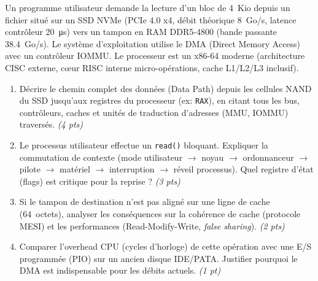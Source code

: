 \documentclass[11pt]{article}
\begin{document}
\begin{exercice}
Un programme utilisateur demande la lecture d'un bloc de \SI{4}{Kio} depuis un fichier situé sur un SSD NVMe (PCIe 4.0 x4, débit théorique \SI{8}{Go/s}, latence contrôleur \SI{20}{\micro s}) vers un tampon en RAM DDR5-4800 (bande passante \SI{38,4}{Go/s}). Le système d'exploitation utilise le DMA (Direct Memory Access) avec un contrôleur IOMMU. Le processeur est un x86-64 moderne (architecture CISC externe, cœur RISC interne micro-opérations, cache L1/L2/L3 inclusif).
\begin{enumerate}
    \item Décrire le chemin complet des données (Data Path) depuis les cellules NAND du SSD jusqu'aux registres du processeur (ex: \texttt{RAX}), en citant tous les bus, contrôleurs, caches et unités de traduction d'adresses (MMU, IOMMU) traversés. \textit{(4 pts)}
    \item Le processus utilisateur effectue un \texttt{read()} bloquant. Expliquer la commutation de contexte (mode utilisateur $\rightarrow$ noyau $\rightarrow$ ordonnanceur $\rightarrow$ pilote $\rightarrow$ matériel $\rightarrow$ interruption $\rightarrow$ réveil processus). Quel registre d'état (flags) est critique pour la reprise ? \textit{(3 pts)}
    \item Si le tampon de destination n'est pas aligné sur une ligne de cache (\SI{64}{octets}), analyser les conséquences sur la cohérence de cache (protocole MESI) et les performances (Read-Modify-Write, \textit{false sharing}). \textit{(2 pts)}
    \item Comparer l'overhead CPU (cycles d'horloge) de cette opération avec une E/S programmée (PIO) sur un ancien disque IDE/PATA. Justifier pourquoi le DMA est indispensable pour les débits actuels. \textit{(1 pt)}
\end{enumerate}
\end{exercice}
\end{document}
